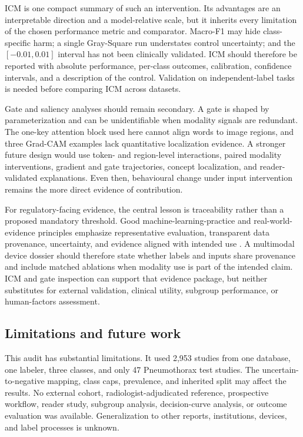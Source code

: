 \documentclass[a4paper,fleqn]{cas-sc}
\begin{document}
ICM is one compact summary of such an intervention. Its advantages are an
interpretable direction and a model-relative scale, but it inherits every
limitation of the chosen performance metric and comparator. Macro-F1 may hide
class-specific harm; a single Gray-Square run understates control uncertainty;
and the $[-0.01,0.01]$ interval has not been clinically validated. ICM should
therefore be reported with absolute performance, per-class outcomes,
calibration, confidence intervals, and a description of the control. Validation
on independent-label tasks is needed before comparing ICM across datasets.

Gate and saliency analyses should remain secondary. A gate is shaped by
parameterization and can be unidentifiable when modality signals are redundant.
The one-key attention block used here cannot align words to image regions, and
three Grad-CAM examples lack quantitative localization evidence. A stronger
future design would use token- and region-level interactions, paired modality
interventions, gradient and gate trajectories, concept localization, and
reader-validated explanations. Even then, behavioural change under input
intervention remains the more direct evidence of contribution.

For regulatory-facing evidence, the central lesson is traceability rather than
a proposed mandatory threshold. Good machine-learning-practice and real-world-
evidence principles emphasize representative evaluation, transparent data
provenance, uncertainty, and evidence aligned with intended use
\cite{fda2025gmlp,fda2025rwe}. A multimodal device dossier should therefore
state whether labels and inputs share provenance and include matched ablations
when modality use is part of the intended claim. ICM and gate inspection can
support that evidence package, but neither substitutes for external validation,
clinical utility, subgroup performance, or human-factors assessment.

\subsection{Limitations and future work}\label{sec:limitations}

This audit has substantial limitations. It used 2,953 studies from one
database, one labeler, three classes, and only 47 Pneumothorax test studies. The
uncertain-to-negative mapping, class caps, prevalence, and inherited split may
affect the results. No external cohort, radiologist-adjudicated reference,
prospective workflow, reader study, subgroup analysis, decision-curve analysis,
or outcome evaluation was available. Generalization to other reports,
institutions, devices, and label processes is unknown.
\end{document}
